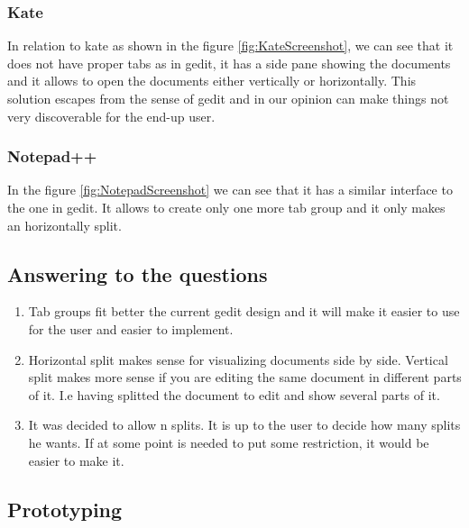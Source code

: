 \subsubsection{Kate}

In relation to kate as shown in the figure \ref{fig:KateScreenshot}, we can see that it does not have proper tabs as in gedit, it has a side pane showing the documents and it allows to open the documents either vertically or horizontally. This solution escapes from the sense of gedit and in our opinion can make things not very discoverable for the end-up user.

\subsubsection{Notepad++}

In the figure \ref{fig:NotepadScreenshot} we can see that it has a similar interface to the one in gedit. It allows to create only one more tab group and it only makes an horizontally split.

\newpage
{}


\newpage
{}

\subsection{Answering to the questions}

\begin{enumerate}
  \item Tab groups fit better the current gedit design and it will make it easier to use for the user and easier to implement.
  \item Horizontal split makes sense for visualizing documents side by side. Vertical split makes more sense if you are editing the same document in different parts of it. I.e having splitted the document to edit and show several parts of it.
  \item It was decided to allow n splits. It is up to the user to decide how many splits he wants. If at some point is needed to put some restriction, it would be easier to make it.
\end{enumerate}

\newpage
\subsection{Prototyping}

